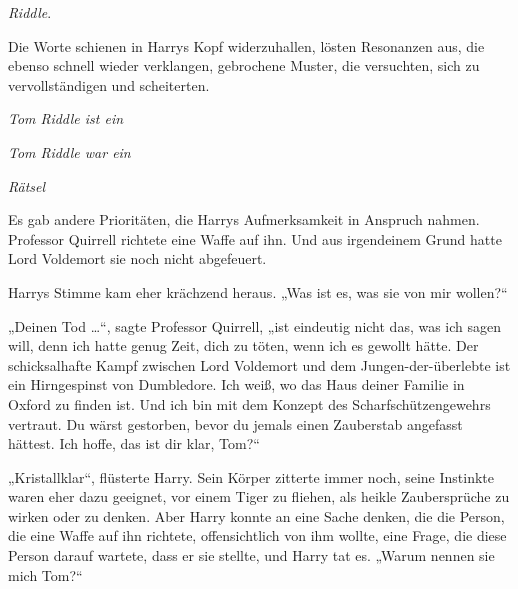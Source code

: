 
 \emph{Riddle}.

\hplettrineextrapara
Die Worte schienen in Harrys Kopf widerzuhallen, lösten Resonanzen aus, die ebenso schnell wieder verklangen, gebrochene Muster, die versuchten, sich zu vervollständigen und scheiterten.

\emph{Tom Riddle ist ein}

\emph{Tom Riddle war ein}

\emph{Rätsel}

Es gab andere Prioritäten, die Harrys Aufmerksamkeit in Anspruch nahmen.
Professor Quirrell richtete eine Waffe auf ihn.
Und aus irgendeinem Grund hatte Lord Voldemort sie noch nicht abgefeuert.

Harrys Stimme kam eher krächzend heraus.
„Was ist es, was sie von mir wollen?“

„Deinen Tod …“, sagte Professor Quirrell, „ist eindeutig nicht das, was ich sagen will, denn ich hatte genug Zeit, dich zu töten, wenn ich es gewollt hätte. Der schicksalhafte Kampf zwischen Lord Voldemort und dem Jungen-der-überlebte ist ein Hirngespinst von Dumbledore. Ich weiß, wo das Haus deiner Familie in Oxford zu finden ist. Und ich bin mit dem Konzept des Scharfschützengewehrs vertraut. Du wärst gestorben, bevor du jemals einen Zauberstab angefasst hättest. Ich hoffe, das ist dir klar, Tom?“

„Kristallklar“, flüsterte Harry.
Sein Körper zitterte immer noch, seine Instinkte waren eher dazu geeignet, vor einem Tiger zu fliehen, als heikle Zaubersprüche zu wirken oder zu denken. Aber Harry konnte an eine Sache denken, die die Person, die eine Waffe auf ihn richtete, offensichtlich von ihm wollte, eine Frage, die diese Person darauf wartete, dass er sie stellte, und Harry tat es.
„Warum nennen sie mich Tom?“

